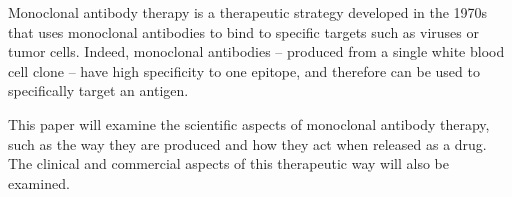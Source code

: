 Monoclonal antibody therapy is a therapeutic strategy developed in the 1970s
that uses monoclonal antibodies to bind to specific targets such as viruses or tumor cells.
Indeed, monoclonal antibodies -- produced from a single white blood cell clone --
have high specificity to one epitope, and therefore can be used to specifically target
an antigen.

This paper will examine the scientific aspects of monoclonal antibody therapy,
such as the way they are produced and how they act when released as a drug.
The clinical and commercial aspects of this therapeutic way will also be examined.
